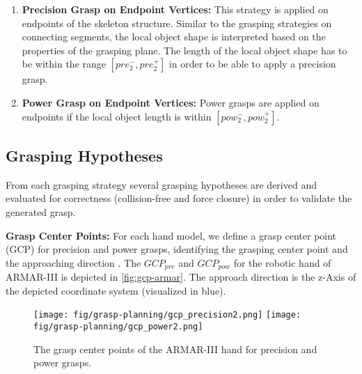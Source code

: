 \begin{enumerate}
\item \textbf{Precision Grasp on Endpoint Vertices:}
This strategy is applied on endpoints of the skeleton structure. Similar to the grasping strategies on connecting segments, the local object shape is interpreted based on the properties of the grasping plane. The length of the local object shape has to be within the range $[pre_2^-,pre_2^+]$ in order to be able to apply a precision grasp.
\item \textbf{Power Grasp on Endpoint Vertices:}
Power grasps are applied on endpoints if the local object length is within $[pow_2^-,pow_2^+]$.
%
%
%
%
\end{enumerate}



 
\subsection{Grasping Hypotheses}
From each grasping strategy several grasping hypotheses are derived and evaluated for correctness (collision-free and force closure) in order to validate the generated grasp.

\textbf{Grasp Center Points:}
For each hand model, we define a grasp center point (GCP) for precision and power grasps, identifying the grasping center point and the approaching direction \cite{Asfour2008b}. The $GCP_{pre}$ and $GCP_{pow}$ for the robotic hand of ARMAR-III is depicted in \autoref{fig:gcp-armar}. The approach direction is the z-Axis of the depicted coordinate system (visualized in blue).

\begin{figure}[t!]%
\centering
\texttt{[image: fig/grasp-planning/gcp\_precision2.png]}
\texttt{[image: fig/grasp-planning/gcp\_power2.png]}
\caption{The grasp center points of the ARMAR-III hand for precision and power grasps.}%
\label{fig:gcp-armar}%
\end{figure}

